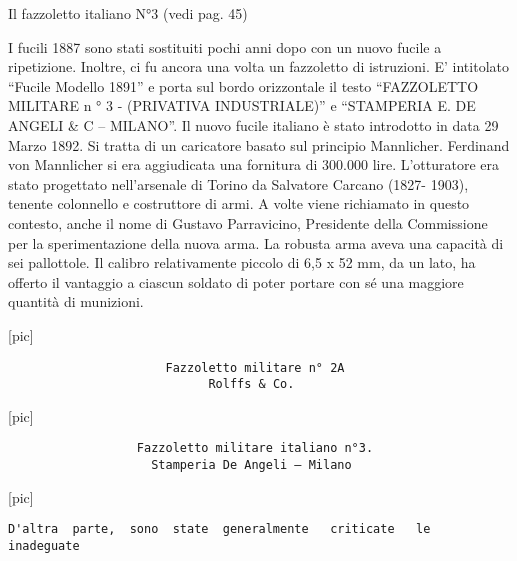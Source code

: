 Il fazzoletto italiano N°3 (vedi pag. 45)

I fucili 1887 sono stati sostituiti pochi anni dopo con un nuovo fucile
a ripetizione. Inoltre, ci fu ancora una volta un fazzoletto di
istruzioni. E' intitolato ``Fucile Modello 1891'' e porta sul bordo
orizzontale il testo ``FAZZOLETTO MILITARE n ° 3 - (PRIVATIVA
INDUSTRIALE)'' e ``STAMPERIA E. DE ANGELI \& C -- MILANO''. Il nuovo
fucile italiano è stato introdotto in data 29 Marzo 1892. Si tratta di
un caricatore basato sul principio Mannlicher. Ferdinand von Mannlicher
si era aggiudicata una fornitura di 300.000 lire. L'otturatore era stato
progettato nell'arsenale di Torino da Salvatore Carcano (1827- 1903),
tenente colonnello e costruttore di armi. A volte viene richiamato in
questo contesto, anche il nome di Gustavo Parravicino, Presidente della
Commissione per la sperimentazione della nuova arma. La robusta arma
aveva una capacità di sei pallottole. Il calibro relativamente piccolo
di 6,5 x 52 mm, da un lato, ha offerto il vantaggio a ciascun soldato di
poter portare con sé una maggiore quantità di munizioni.

{[}pic{]}

\begin{verbatim}
                      Fazzoletto militare n° 2A
                            Rolffs & Co.
\end{verbatim}

{[}pic{]}

\begin{verbatim}
                  Fazzoletto militare italiano n°3.
                    Stamperia De Angeli – Milano
\end{verbatim}

{[}pic{]}

\begin{verbatim}
D'altra  parte,  sono  state  generalmente   criticate   le   inadeguate
\end{verbatim}

